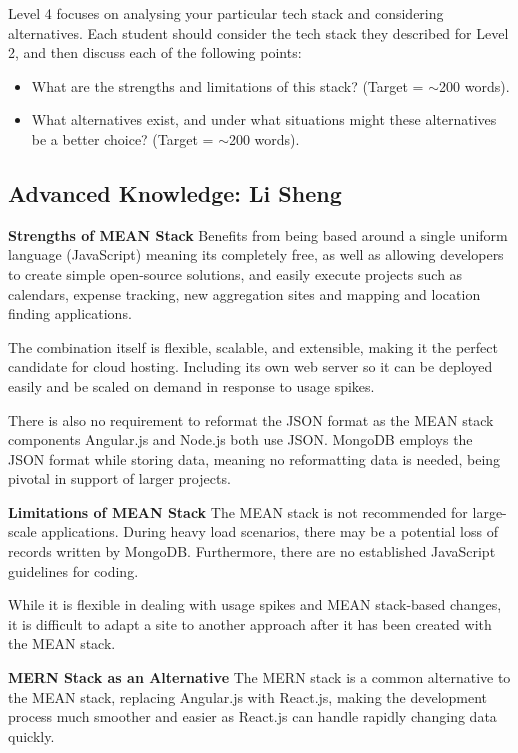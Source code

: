 \documentclass[a4paper, 11pt]{report}
\begin{document}
Level 4 focuses on analysing your particular tech stack and considering alternatives. Each student should consider the tech stack they described for Level 2, and then discuss each of the following points:
\begin{itemize}
    \item What are the strengths and limitations of this stack? (Target = $\sim$200 words).
    \item What alternatives exist, and under what situations might these alternatives be a better choice? (Target = $\sim$200 words).
\end{itemize}

\subsection{Advanced Knowledge: Li Sheng}

\textbf{Strengths of MEAN Stack}
Benefits from being based around a single uniform language (JavaScript) meaning its completely free, as well as allowing developers to create simple open-source solutions, and easily execute projects such as calendars, expense tracking, new aggregation sites and mapping and location finding applications. \cite{ali10}

The combination itself is flexible, scalable, and extensible, making it the perfect candidate for cloud hosting. Including its own web server so it can be deployed easily and be scaled on demand in response to usage spikes. \cite{ali11}

There is also no requirement to reformat the JSON format as the MEAN stack components Angular.js and Node.js both use JSON. MongoDB employs the JSON format while storing data, meaning no reformatting data is needed, being pivotal in support of larger projects. \cite{ali12}

\textbf{Limitations of MEAN Stack}
The MEAN stack is not recommended for large-scale applications. During heavy load scenarios, there may be a potential loss of records written by MongoDB. Furthermore, there are no established JavaScript guidelines for coding. \cite{ali11}

While it is flexible in dealing with usage spikes and MEAN stack-based changes, it is difficult to adapt a site to another approach after it has been created with the MEAN stack. \cite{ali10}


\textbf{MERN Stack as an Alternative}
The MERN stack is a common alternative to the MEAN stack, replacing Angular.js with React.js, making the development process much smoother and easier as React.js can handle rapidly changing data quickly. \cite{ali13}
\end{document}
